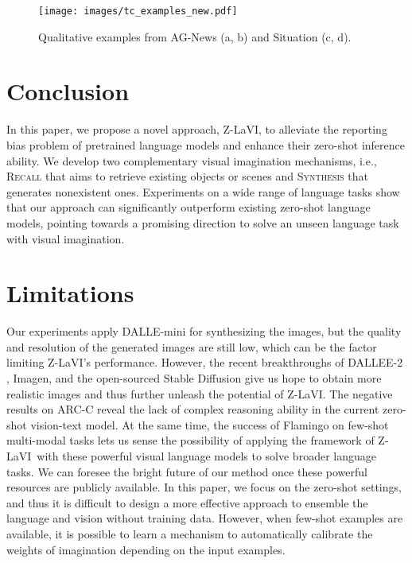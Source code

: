 \documentclass[11pt]{article}
\newcommand{\model}{Z-LaVI}
\begin{document}
\begin{figure}[!t]
\centering
    \texttt{[image: images/tc\_examples\_new.pdf]}
    \caption{Qualitative examples from AG-News (a, b) and Situation (c, d).}
    \label{fig:tc examples}
    \vspace{-.15cm}
\end{figure}

\vspace{-.1cm}
\section{Conclusion}
\vspace{-.1cm}
In this paper, we propose a novel approach, Z-LaVI, to alleviate the reporting bias problem of pretrained language models and enhance their zero-shot inference ability. We develop two complementary visual imagination mechanisms, i.e., \textsc{Recall} that aims to retrieve existing objects or scenes and \textsc{Synthesis} that generates nonexistent ones. Experiments on a wide range of language tasks show that our approach can significantly outperform existing zero-shot language models, pointing towards a promising direction to solve an unseen language task with visual imagination.

\section{Limitations}
Our experiments apply DALLE-mini for synthesizing the images, but the quality and resolution of the generated images are still low, which can be the factor limiting \model's performance. However, the recent breakthroughs of DALLEE-2 \cite{ramesh2022hierarchical}, Imagen, \cite{saharia2022photorealistic} and the open-sourced Stable Diffusion \cite{rombach2022high} give us hope to obtain more realistic images and thus further unleash the potential of \model. The negative results on ARC-C reveal the lack of complex reasoning ability in the current zero-shot vision-text model. At the same time, the success of Flamingo \cite{alayrac2022flamingo} on few-shot multi-modal tasks lets us sense the possibility of applying the framework of \model~with these powerful visual language models to solve broader language tasks. We can foresee the bright future of our method once these powerful resources are publicly available. In this paper, we focus on the zero-shot settings, and thus it is difficult to design a more effective approach to ensemble the language and vision without training data. However, when few-shot examples are available, it is possible to learn a mechanism to automatically calibrate the weights of imagination depending on the input examples.
\end{document}
